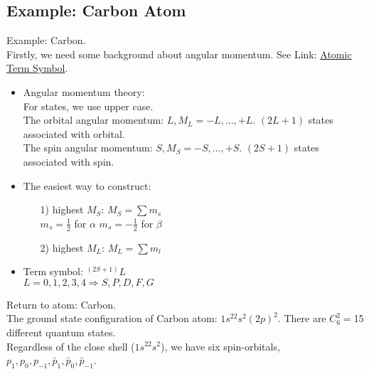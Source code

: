 \documentclass[a4paper, 12pt]{article}
\begin{document}
\subsection{Example: Carbon Atom}
Example: Carbon.\\
\tab Firstly, we need some background about angular momentum. 
See Link:  \href{http://scienide2.uwaterloo.ca/~nooijen/website_new_20_10_2011/Chem440_quantum/Many_electron_angular_momentum.pdf}{Atomic Term Symbol}.
\begin{itemize}
	\item  Angular momentum theory: \\
 For states, we use upper case.\\
 The orbital angular momentum: $L, M_L=-L,\ldots,+L$. $(2L+1)$ states associated with orbital.\\
 The spin angular momentum: $S, M_S=-S,\ldots,+S$. $(2S+1)$ states associated with spin.
 \item The easiest way to construct: 
 \begin{itemize}
 \item[1)] highest $M_S $: \tab   $M_S = \sum m_s$\\
 \tab\tab\tab\tab $m_s=\frac{1}{2}$ for $\alpha$ \tab\tab $m_s=-\frac{1}{2}$ for $\beta$
 \item[2)] highest $M_L $: \tab   $M_L = \sum m_l$\\


 
 \end{itemize}
 \item Term symbol: $^{(2S+1)}L$\\
 $L= 0,1,2,3,4 \Rightarrow S,P,D,F,G $\\
 
\end{itemize}




Return to atom: Carbon.\\
\tab The ground state configuration of Carbon atom: $1s^22s^2(2p)^2$. There are $C_6^2 =$15 different quantum states.\\
\tab Regardless of the close shell ($1s^22s^2$), we have six spin-orbitals, $p_1,p_0,p_{-1}, \bar{p}_1,\bar{p}_0,\bar{p}_{-1}$. 
\end{document}
